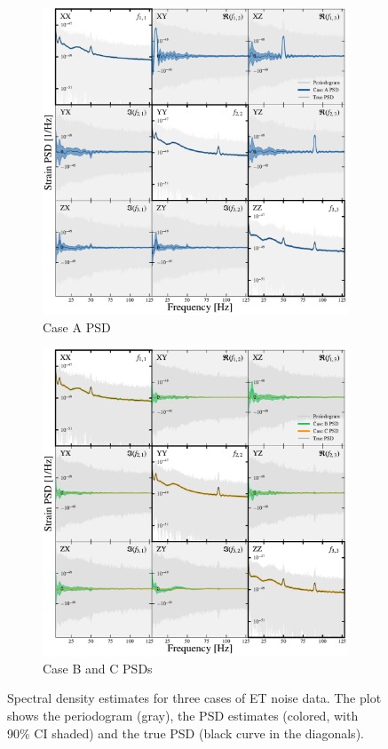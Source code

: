 \documentclass[%
 reprint,
 amsmath,amssymb,
 aps,
 nofootinbib,
]{revtex4-2}
\begin{document}
\begin{figure}[]
\centering
\begin{subfigure}{\columnwidth}
  \centering
  \includegraphics[width=1.05\columnwidth]{caseA_psd.pdf}
  \caption{Case A PSD}
  \label{fig:caseA_psd}
\end{subfigure}
\hfill
\begin{subfigure}{\columnwidth}
  \centering
  \includegraphics[width=1.05\columnwidth]{caseBC_psd.pdf}
  \caption{Case B and C PSDs}
  \label{fig:caseBC_psd}
\end{subfigure}
\caption{Spectral density estimates for three cases of ET noise data. The plot shows the periodogram (gray), the PSD estimates (colored, with 90\% CI shaded) and the true PSD (black curve in the diagonals).}
\label{fig:ET_PSDS}
\end{figure}
\end{document}
